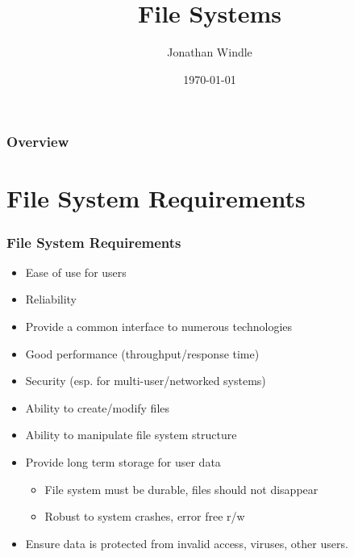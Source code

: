 \documentclass{beamer}
\title[File Systems]{File Systems} %
\author{Jonathan Windle} %
\institute[UEA] %
{
University of East Anglia \\ %
\medskip
\textit{J.Windle@uea.ac.uk} %
}
\date{\today} %
\begin{document}
\begin{frame}
\titlepage %
\end{frame}

\begin{frame}[allowframebreaks]
\frametitle{Overview} %
\tableofcontents %
\end{frame}

\section{File System Requirements}
\begin{frame}
\frametitle{File System Requirements}
\begin{itemize}
\item Ease of use for users
\item Reliability
\item Provide a common interface to numerous technologies
\item Good performance (throughput/response time)
\item Security (esp. for multi-user/networked systems)
\item Ability to create/modify files
\item Ability to manipulate file system structure
\item Provide long term storage for user data
\begin{itemize}
\item File system must be durable, files should not disappear
\item Robust to system crashes, error free r/w
\end{itemize}
\item Ensure data is protected from invalid access, viruses, other users.
\end{itemize}
\end{frame}
\end{document}

